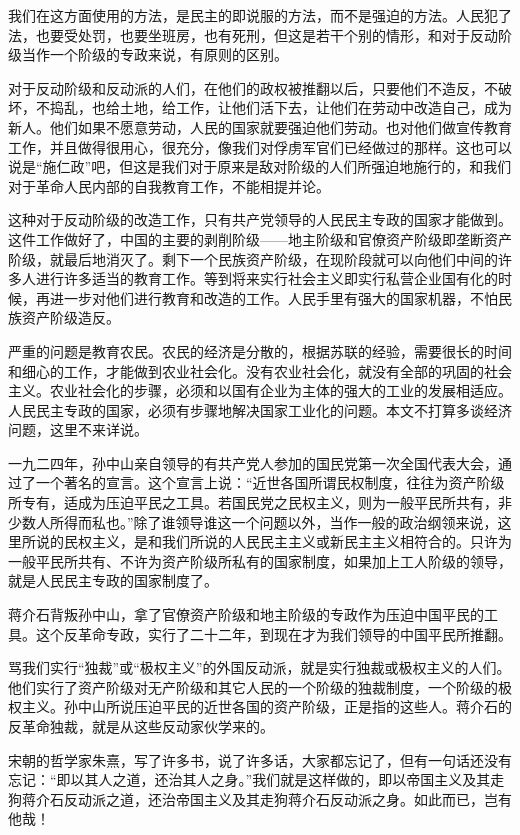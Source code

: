 我们在这方面使用的方法，是民主的即说服的方法，而不是强迫的方法。人民犯了法，也要受处罚，也要坐班房，也有死刑，但这是若干个别的情形，和对于反动阶级当作一个阶级的专政来说，有原则的区别。

对于反动阶级和反动派的人们，在他们的政权被推翻以后，只要他们不造反，不破坏，不捣乱，也给土地，给工作，让他们活下去，让他们在劳动中改造自己，成为新人。他们如果不愿意劳动，人民的国家就要强迫他们劳动。也对他们做宣传教育工作，并且做得很用心，很充分，像我们对俘虏军官们已经做过的那样。这也可以说是“施仁政”吧，但这是我们对于原来是敌对阶级的人们所强迫地施行的，和我们对于革命人民内部的自我教育工作，不能相提并论。

这种对于反动阶级的改造工作，只有共产党领导的人民民主专政的国家才能做到。这件工作做好了，中国的主要的剥削阶级——地主阶级和官僚资产阶级即垄断资产阶级，就最后地消灭了。剩下一个民族资产阶级，在现阶段就可以向他们中间的许多人进行许多适当的教育工作。等到将来实行社会主义即实行私营企业国有化的时候，再进一步对他们进行教育和改造的工作。人民手里有强大的国家机器，不怕民族资产阶级造反。

严重的问题是教育农民。农民的经济是分散的，根据苏联的经验，需要很长的时间和细心的工作，才能做到农业社会化。没有农业社会化，就没有全部的巩固的社会主义。农业社会化的步骤，必须和以国有企业为主体的强大的工业的发展相适应。人民民主专政的国家，必须有步骤地解决国家工业化的问题。本文不打算多谈经济问题，这里不来详说。

一九二四年，孙中山亲自领导的有共产党人参加的国民党第一次全国代表大会，通过了一个著名的宣言。这个宣言上说：“近世各国所谓民权制度，往往为资产阶级所专有，适成为压迫平民之工具。若国民党之民权主义，则为一般平民所共有，非少数人所得而私也。”除了谁领导谁这一个问题以外，当作一般的政治纲领来说，这里所说的民权主义，是和我们所说的人民民主主义或新民主主义相符合的。只许为一般平民所共有、不许为资产阶级所私有的国家制度，如果加上工人阶级的领导，就是人民民主专政的国家制度了。

蒋介石背叛孙中山，拿了官僚资产阶级和地主阶级的专政作为压迫中国平民的工具。这个反革命专政，实行了二十二年，到现在才为我们领导的中国平民所推翻。

骂我们实行“独裁”或“极权主义”的外国反动派，就是实行独裁或极权主义的人们。他们实行了资产阶级对无产阶级和其它人民的一个阶级的独裁制度，一个阶级的极权主义。孙中山所说压迫平民的近世各国的资产阶级，正是指的这些人。蒋介石的反革命独裁，就是从这些反动家伙学来的。

宋朝的哲学家朱熹，写了许多书，说了许多话，大家都忘记了，但有一句话还没有忘记：“即以其人之道，还治其人之身。”我们就是这样做的，即以帝国主义及其走狗蒋介石反动派之道，还治帝国主义及其走狗蒋介石反动派之身。如此而已，岂有他哉！

